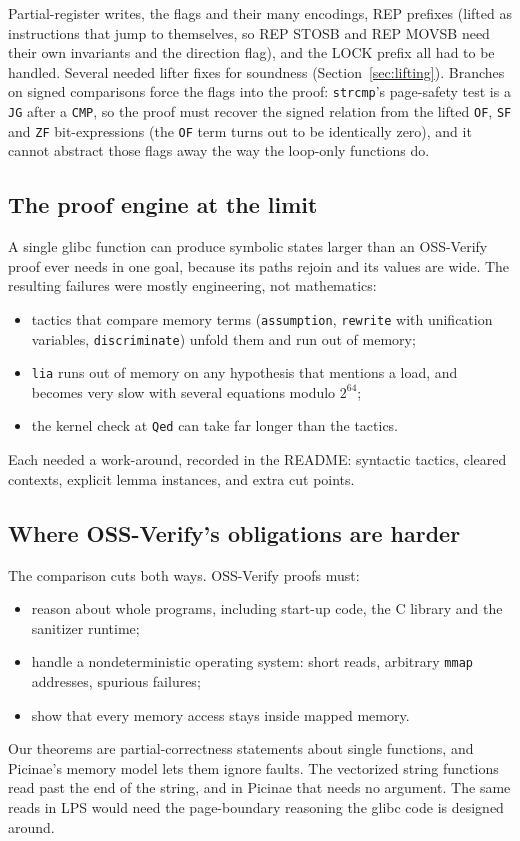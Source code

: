 \documentclass[11pt]{article}
\newcommand{\code}[1]{\texttt{#1}}
\begin{document}
Partial-register writes, the flags and their many encodings, REP prefixes
(lifted as instructions that jump to themselves, so REP STOSB and REP MOVSB
need their own invariants and the direction flag), and the LOCK prefix all
had to be handled.  Several needed lifter fixes for soundness
(Section~\ref{sec:lifting}).  Branches on signed comparisons force the flags
into the proof: \code{strcmp}'s page-safety test is a \code{JG} after a
\code{CMP}, so the proof must recover the signed relation from the lifted
\code{OF}, \code{SF} and \code{ZF} bit-expressions (the \code{OF} term turns
out to be identically zero), and it cannot abstract those flags away the way
the loop-only functions do.

\subsection{The proof engine at the limit}

A single glibc function can produce symbolic states larger than an
OSS-Verify proof ever needs in one goal, because its paths rejoin and its
values are wide.  The resulting failures were mostly engineering, not
mathematics:
\begin{itemize}[nosep]
\item tactics that compare memory terms (\code{assumption}, \code{rewrite}
      with unification variables, \code{discriminate}) unfold them and run
      out of memory;
\item \code{lia} runs out of memory on any hypothesis that mentions a load,
      and becomes very slow with several equations modulo $2^{64}$;
\item the kernel check at \code{Qed} can take far longer than the tactics.
\end{itemize}
Each needed a work-around, recorded in the README: syntactic tactics,
cleared contexts, explicit lemma instances, and extra cut points.

\subsection{Where OSS-Verify's obligations are harder}

The comparison cuts both ways.  OSS-Verify proofs must:
\begin{itemize}[nosep]
\item reason about whole programs, including start-up code, the C library
      and the sanitizer runtime;
\item handle a nondeterministic operating system: short reads, arbitrary
      \code{mmap} addresses, spurious failures;
\item show that every memory access stays inside mapped memory.
\end{itemize}
Our theorems are partial-correctness statements about single functions, and
Picinae's memory model lets them ignore faults.  The vectorized string
functions read past the end of the string, and in Picinae that needs no
argument.  The same reads in LPS would need the page-boundary reasoning the
glibc code is designed around.
\end{document}
